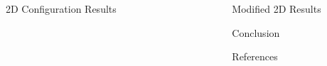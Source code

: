 \documentclass[final]{beamer}
\newlength{\sepwid}
\newlength{\onecolwid}
\begin{document}
\begin{frame}[t]
\begin{columns}[t]
\begin{column}{\onecolwid}
\begin{block}{2D Configuration Results}


\end{block}


\end{column} %


\begin{column}{\sepwid}\end{column} %

\begin{column}{\onecolwid} %


\begin{block}{Modified 2D Results}

\end{block}


\begin{block}{Conclusion}



\end{block}



\begin{block}{References}

\nocite{*} %
\small{
\vspace{0.75in}}


\end{block}
\end{column}
\end{columns}
\end{frame}
\end{document}
